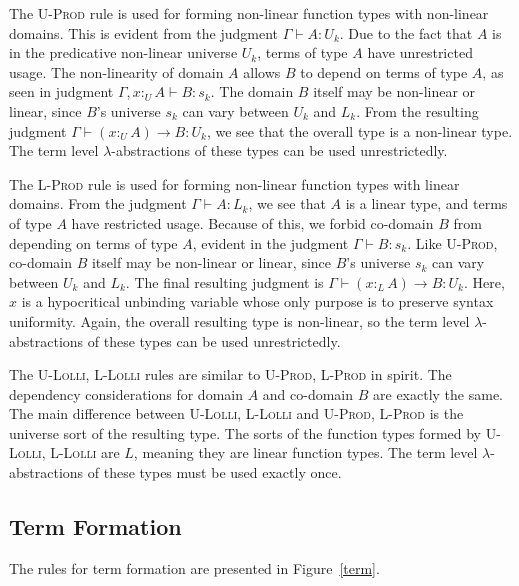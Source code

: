 \documentclass[sigplan,screen]{acmart}
\theoremstyle{definition}
\newcommand{\rname}[1]{\textsc{\footnotesize #1}}
\newcommand{\utype}{:_{\scriptscriptstyle U}}
\newcommand{\ltype}{:_{\scriptscriptstyle L}}
\begin{document}
  The \rname{U-Prod} rule is used for forming non-linear function types with non-linear domains. This is evident from the judgment $\Gamma \vdash A : U_k$. Due to the fact that $A$ is in the predicative non-linear universe $U_k$, terms of type $A$ have unrestricted usage. The non-linearity of domain $A$ allows $B$ to depend on terms of type $A$, as seen in judgment $\Gamma, x \utype A \vdash B : s_k$. The domain $B$ itself may be non-linear or linear, since $B$'s universe $s_k$ can vary between $U_k$ and $L_k$. From the resulting judgment $\Gamma \vdash (x \utype A) \rightarrow B : U_k$, we see that the overall type is a non-linear type. The term level $\lambda$-abstractions of these types can be used unrestrictedly.

  The \rname{L-Prod} rule is used for forming non-linear function types with linear domains. From the judgment $\Gamma \vdash A : L_k$, we see that $A$ is a linear type, and terms of type $A$ have restricted usage. Because of this, we forbid co-domain $B$ from depending on terms of type $A$, evident in the judgment $\Gamma \vdash B : s_k$. Like \rname{U-Prod}, co-domain $B$ itself may be non-linear or linear, since $B$'s universe $s_k$ can vary between $U_k$ and $L_k$. The final resulting judgment is $\Gamma \vdash (x \ltype A) \rightarrow B : U_k$. Here, $x$ is a hypocritical unbinding variable whose only purpose is to preserve syntax uniformity. Again, the overall resulting type is non-linear, so the term level $\lambda$-abstractions of these types can be used unrestrictedly.

  The \rname{U-Lolli}, \rname{L-Lolli} rules are similar to \rname{U-Prod}, \rname{L-Prod} in spirit. The dependency considerations for domain $A$ and co-domain $B$ are exactly the same. The main difference between \rname{U-Lolli}, \rname{L-Lolli} and \rname{U-Prod}, \rname{L-Prod} is the universe sort of the resulting type. The sorts of the function types formed by \rname{U-Lolli}, \rname{L-Lolli} are $L$, meaning they are linear function types. The term level $\lambda$-abstractions of these types must be used exactly once.

  \subsection{Term Formation} \label{teformation}
  The rules for term formation are presented in Figure~\ref{term}.
\end{document}
